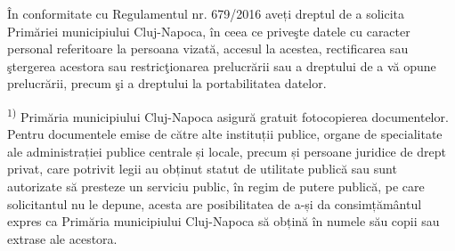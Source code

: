 \documentclass[11pt,a4paper]{article}
\begin{document}
În conformitate cu Regulamentul nr. 679/2016 aveți dreptul de a solicita Primăriei municipiului Cluj-Napoca, în ceea ce priveşte datele cu caracter personal referitoare la persoana vizată, accesul la acestea, rectificarea sau ştergerea acestora sau restricţionarea prelucrării sau a dreptului de a vă opune prelucrării, precum şi a dreptului la portabilitatea datelor.

\textsuperscript{1)} Primăria municipiului Cluj-Napoca asigură gratuit fotocopierea documentelor. Pentru documentele emise de către alte instituții publice, organe de specialitate ale administrației publice centrale și locale, precum și persoane juridice de drept privat, care potrivit legii au obținut statut de utilitate publică sau sunt autorizate să presteze un serviciu public, în regim de putere publică, pe care solicitantul nu le depune, acesta are posibilitatea de a-și da consimțământul expres ca Primăria municipiului Cluj-Napoca să obțină în numele său copii sau extrase ale acestora.
\end{document}
